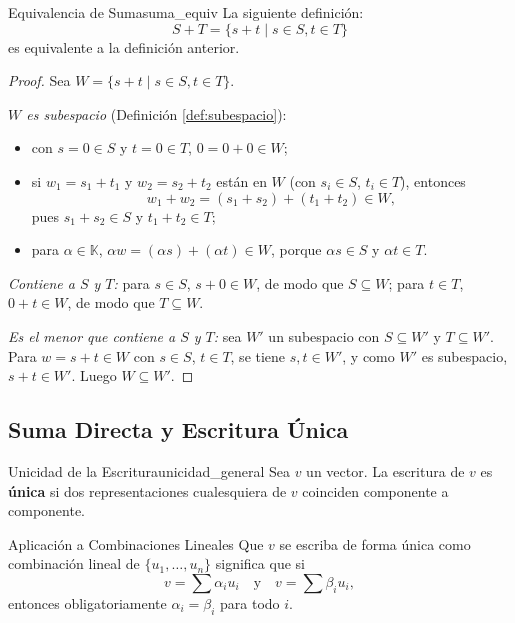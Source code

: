 \documentclass[11pt, a4paper]{article}
\begin{document}
\begin{proposicion}{Equivalencia de Suma}{suma_equiv}
La siguiente definición:
\[
S+T = \{ s+t \mid s \in S, t \in T \}
\]
es equivalente a la definición anterior.
\end{proposicion}

\begin{proof}
Sea $W = \{ s+t \mid s \in S, t \in T \}$.

\textit{$W$ es subespacio} (Definición \ref{def:subespacio}):
\begin{itemize}
    \item con $s=0 \in S$ y $t=0 \in T$, $0 = 0+0 \in W$;
    \item si $w_1 = s_1+t_1$ y $w_2 = s_2+t_2$ están en $W$ (con $s_i \in S$, $t_i \in T$), entonces
    \[
    w_1 + w_2 = (s_1+s_2) + (t_1+t_2) \in W,
    \]
    pues $s_1+s_2 \in S$ y $t_1+t_2 \in T$;
    \item para $\alpha \in \mathbb{K}$, $\alpha w = (\alpha s) + (\alpha t) \in W$, porque $\alpha s \in S$ y $\alpha t \in T$.
\end{itemize}

\textit{Contiene a $S$ y $T$:} para $s \in S$, $s+0 \in W$, de modo que $S \subseteq W$; para $t \in T$, $0+t \in W$, de modo que $T \subseteq W$.

\textit{Es el menor que contiene a $S$ y $T$:} sea $W'$ un subespacio con $S \subseteq W'$ y $T \subseteq W'$. Para $w = s+t \in W$ con $s \in S$, $t \in T$, se tiene $s, t \in W'$, y como $W'$ es subespacio, $s+t \in W'$. Luego $W \subseteq W'$.
\end{proof}

\subsection{Suma Directa y Escritura Única}

\begin{definicion}{Unicidad de la Escritura}{unicidad_general}
Sea $v$ un vector. La escritura de $v$ es \textbf{única} si dos representaciones cualesquiera de $v$ coinciden componente a componente.
\end{definicion}

\begin{ejemplo}{Aplicación a Combinaciones Lineales}{}
Que $v$ se escriba de forma única como combinación lineal de $\{u_1, \dots, u_n\}$ significa que si
\[
v = \sum \alpha_i u_i \quad \text{y} \quad v = \sum \beta_i u_i,
\]
entonces obligatoriamente $\alpha_i = \beta_i$ para todo $i$.
\end{ejemplo}
\end{document}
